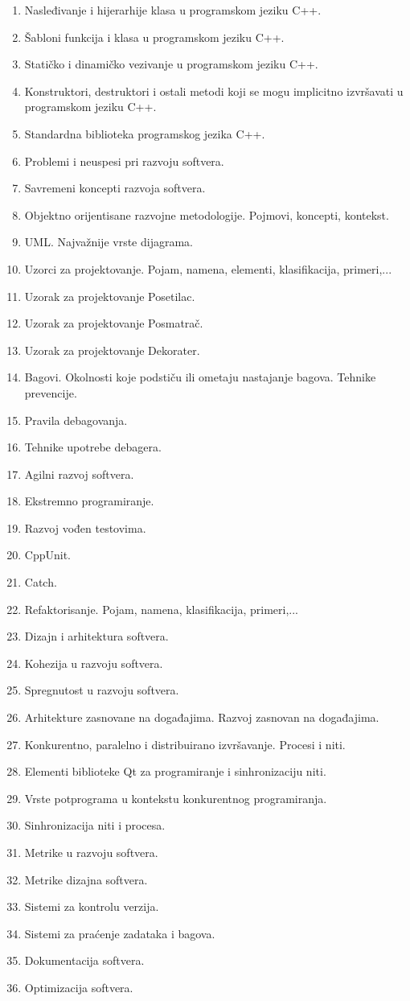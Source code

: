 \documentclass[a4paper]{article}
\begin{document}
\begin{enumerate}
 	\item Nasleđivanje i hijerarhije klasa u programskom jeziku C++.
	\item Šabloni funkcija i klasa u programskom jeziku C++.
	\item Statičko i dinamičko vezivanje u programskom jeziku C++.
	\item Konstruktori, destruktori i ostali metodi koji se mogu implicitno izvršavati u programskom jeziku C++.
	\item Standardna biblioteka programskog jezika C++.
	\item Problemi i neuspesi pri razvoju softvera.
	\item Savremeni koncepti razvoja softvera.
	\item Objektno orijentisane razvojne metodologije. Pojmovi, koncepti, kontekst.
	\item UML. Najvažnije vrste dijagrama.
	\item Uzorci za projektovanje. Pojam, namena, elementi, klasifikacija, primeri,...
	\item Uzorak za projektovanje Posetilac.
	\item Uzorak za projektovanje Posmatrač.
	\item Uzorak za projektovanje Dekorater.
	\item Bagovi. Okolnosti koje podstiču ili ometaju nastajanje bagova. Tehnike prevencije.
	\item Pravila debagovanja.
	\item Tehnike upotrebe debagera.
	\item Agilni razvoj softvera.
	\item Ekstremno programiranje.
	\item Razvoj vođen testovima.
	\item CppUnit.
	\item Catch.
	\item Refaktorisanje. Pojam, namena, klasifikacija, primeri,...
	\item Dizajn i arhitektura softvera.
	\item Kohezija u razvoju softvera.
	\item Spregnutost u razvoju softvera.
	\item Arhitekture zasnovane na događajima. Razvoj zasnovan na događajima.
	\item Konkurentno, paralelno i distribuirano izvršavanje. Procesi i niti.
	\item Elementi biblioteke Qt za programiranje i sinhronizaciju niti.
	\item Vrste potprograma u kontekstu konkurentnog programiranja.
	\item Sinhronizacija niti i procesa.
	\item Metrike u razvoju softvera.
	\item Metrike dizajna softvera.
	\item Sistemi za kontrolu verzija.
	\item Sistemi za praćenje zadataka i bagova.
	\item Dokumentacija softvera.
	\item Optimizacija softvera.
\end{enumerate}
		

\newpage

\appendix
 

\end{document}

